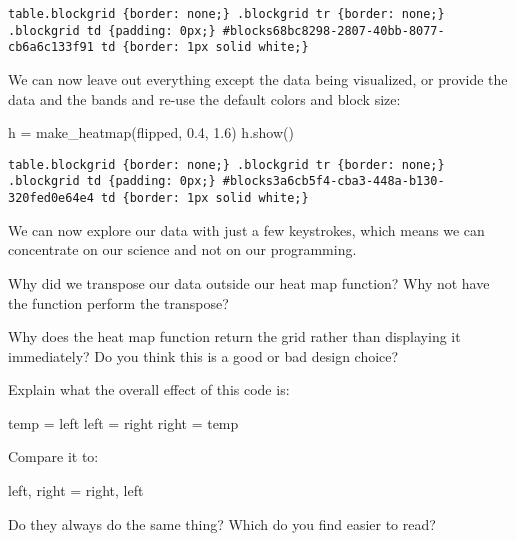 \documentclass{book}
\begin{document}
\begin{Verbatim}
table.blockgrid {border: none;} .blockgrid tr {border: none;} .blockgrid td {padding: 0px;} #blocks68bc8298-2807-40bb-8077-cb6a6c133f91 td {border: 1px solid white;}
\end{Verbatim}

We can now leave out everything except the data being visualized, or
provide the data and the bands and re-use the default colors and block
size:

\begin{VerbIn}
h = make_heatmap(flipped, 0.4, 1.6)
h.show()
\end{VerbIn}

\begin{Verbatim}
table.blockgrid {border: none;} .blockgrid tr {border: none;} .blockgrid td {padding: 0px;} #blocks3a6cb5f4-cba3-448a-b130-320fed0e64e4 td {border: 1px solid white;}
\end{Verbatim}

We can now explore our data with just a few keystrokes, which means we
can concentrate on our science and not on our programming.

\begin{challenge}
  Why did we transpose our data outside our heat map function? Why not
  have the function perform the transpose?
\end{challenge}

\begin{challenge}
  Why does the heat map function return the grid rather than displaying
  it immediately? Do you think this is a good or bad design choice?
\end{challenge}

\begin{challenge}
  Explain what the overall effect of this code is:
\begin{VerbIn}
temp = left
left = right
right = temp
\end{VerbIn}
Compare it to:
\begin{VerbIn}
left, right = right, left
\end{VerbIn}
  Do they always do the same thing?
  Which do you find easier to read?
\end{challenge}
\end{document}
